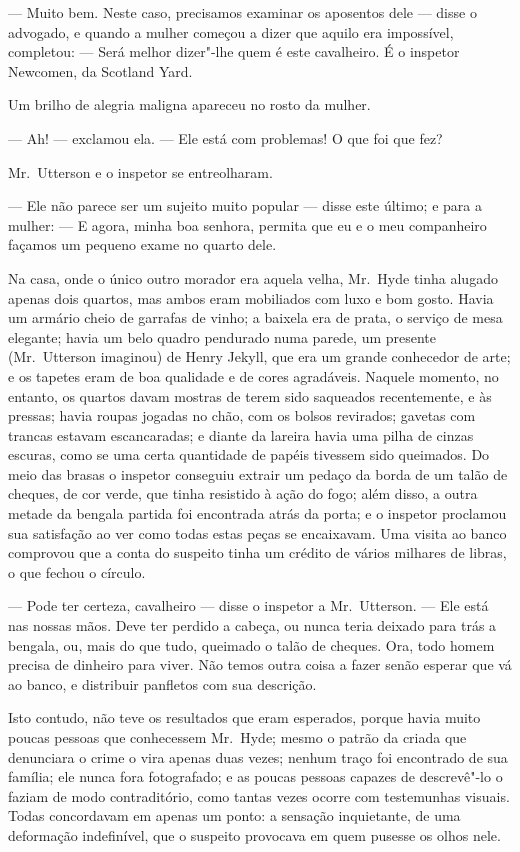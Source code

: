 --- Muito bem.  Neste caso, precisamos examinar os aposentos dele ---
disse o advogado, e quando a mulher começou a dizer que aquilo era
impossível, completou: --- Será melhor dizer"-lhe quem é este cavalheiro. 
É o inspetor Newcomen, da Scotland Yard.

Um brilho de alegria maligna apareceu no rosto da mulher.

--- Ah! --- exclamou ela. --- Ele está com problemas!  O que foi que fez?

Mr.~Utterson e o inspetor se entreolharam.

--- Ele não parece ser um sujeito muito popular --- disse este último; e
para a mulher: --- E agora, minha boa senhora, permita que eu e o meu
companheiro façamos um pequeno exame no quarto dele.

Na casa, onde o único outro morador era aquela velha, Mr.~Hyde tinha
alugado apenas dois quartos, mas ambos eram mobiliados com luxo e bom
gosto.  Havia um armário cheio de garrafas de vinho; a baixela era de
prata, o serviço de mesa elegante; havia um belo quadro pendurado numa
parede, um presente (Mr.~Utterson imaginou) de Henry Jekyll, que era um
grande conhecedor de arte; e os tapetes eram de boa qualidade e de
cores agradáveis. Naquele momento, no entanto, os quartos davam mostras
de terem sido saqueados recentemente, e às pressas; havia roupas
jogadas no chão, com os bolsos revirados; gavetas com trancas estavam
escancaradas; e diante da lareira havia uma pilha de cinzas escuras,
como se uma certa quantidade de papéis tivessem sido queimados.  Do
meio das brasas o inspetor conseguiu extrair um pedaço da borda de um
talão de cheques, de cor verde, que tinha resistido à ação do fogo;
além disso, a outra metade da bengala partida foi encontrada atrás da
porta; e o inspetor proclamou sua satisfação ao ver como todas estas
peças se encaixavam.  Uma visita ao banco comprovou que a conta do
suspeito tinha um crédito de vários milhares de libras, o que fechou o
círculo.

--- Pode ter certeza, cavalheiro --- disse o inspetor a Mr.~Utterson. ---
Ele está nas nossas mãos.  Deve ter perdido a cabeça, ou nunca teria
deixado para trás a bengala, ou, mais do que tudo, queimado o talão de
cheques.  Ora, todo homem precisa de dinheiro para viver.  Não temos
outra coisa a fazer senão esperar que vá ao banco, e distribuir
panfletos com sua descrição.

Isto contudo, não teve os resultados que eram esperados, porque havia
muito poucas pessoas que conhecessem Mr.~Hyde; mesmo o patrão da criada
que denunciara o crime o vira apenas duas vezes; nenhum traço foi
encontrado de sua família; ele nunca fora fotografado; e as poucas
pessoas capazes de descrevê"-lo o faziam de modo contraditório, como
tantas vezes ocorre com testemunhas visuais. Todas concordavam em
apenas um ponto: a sensação inquietante, de uma deformação indefinível,
que o suspeito provocava em quem pusesse os olhos nele. 



